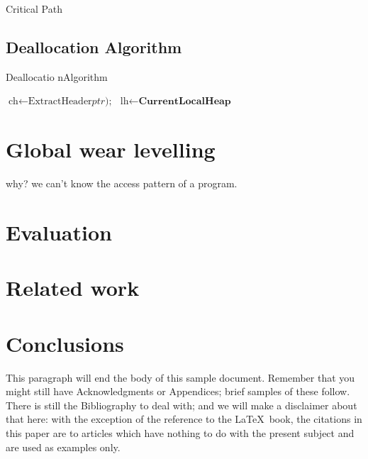 \documentclass{vldb}
\begin{document}
Critical Path

\subsection{Deallocation Algorithm}


\begin{algorithm}
\caption{Deallocatio nAlgorithm}\label{euclid}
\begin{algorithmic}[1]

\State $\text{ch} \gets \text{ExtractHeader}\textit{ptr}\text{);}$
\State $\text{lh} \gets \textbf{CurrentLocalHeap}$

\State {}
\Else
\State {}
\EndIf

\EndProcedure
\end{algorithmic}
\end{algorithm}



\section{Global wear levelling}

why? we can’t know the access pattern of a program.

\section{Evaluation}

\section{Related work}


\section{Conclusions}
This paragraph will end the body of this sample document.
Remember that you might still have Acknowledgments or
Appendices; brief samples of these
follow.  There is still the Bibliography to deal with; and
we will make a disclaimer about that here: with the exception
of the reference to the \LaTeX\ book, the citations in
this paper are to articles which have nothing to
do with the present subject and are used as
examples only.

\balance
\end{document}
